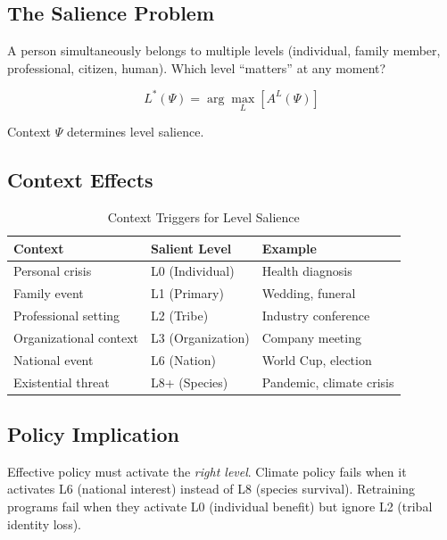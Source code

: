 \documentclass[12pt,a4paper]{article}
\begin{document}
\subsection{The Salience Problem}

A person simultaneously belongs to multiple levels (individual, family member, 
professional, citizen, human). Which level ``matters'' at any moment?

\begin{equation}
L^*(\Psi) = \arg\max_L \left[ A^L(\Psi) \right]
\label{eq:salience}
\end{equation}

Context $\Psi$ determines level salience.

\subsection{Context Effects}

\begin{table}[htbp]
\centering
\caption{Context Triggers for Level Salience}
\label{tab:salience}
\renewcommand{\arraystretch}{1.3}
\begin{tabular}{@{}lll@{}}
\toprule
\textbf{Context} & \textbf{Salient Level} & \textbf{Example} \\
\midrule
Personal crisis & L0 (Individual) & Health diagnosis \\
Family event & L1 (Primary) & Wedding, funeral \\
Professional setting & L2 (Tribe) & Industry conference \\
Organizational context & L3 (Organization) & Company meeting \\
National event & L6 (Nation) & World Cup, election \\
Existential threat & L8+ (Species) & Pandemic, climate crisis \\
\bottomrule
\end{tabular}
\end{table}

\subsection{Policy Implication}

Effective policy must activate the \textit{right level}. Climate policy 
fails when it activates L6 (national interest) instead of L8 (species survival). 
Retraining programs fail when they activate L0 (individual benefit) but 
ignore L2 (tribal identity loss).
\end{document}

